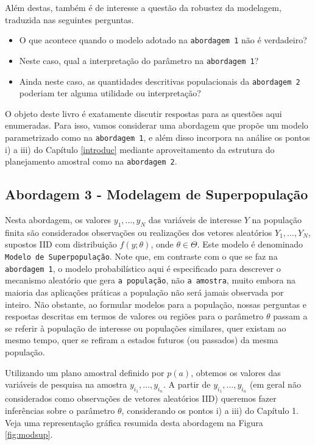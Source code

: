 \documentclass[]{book}
\providecommand{\tightlist}{%
  \setlength{\itemsep}{0pt}\setlength{\parskip}{0pt}}
\theoremstyle{definition}
\theoremstyle{definition}
\theoremstyle{definition}
\theoremstyle{remark}
\begin{document}
Além destas, também é de interesse a questão da robustez da modelagem,
traduzida nas seguintes perguntas.

\begin{itemize}
\tightlist
\item
  O que acontece quando o modelo adotado na \texttt{abordagem\ 1} não é
  verdadeiro?
\item
  Neste caso, qual a interpretação do parâmetro na
  \texttt{abordagem\ 1}?
\item
  Ainda neste caso, as quantidades descritivas populacionais da
  \texttt{abordagem\ 2} poderiam ter alguma utilidade ou interpretação?
\end{itemize}

O objeto deste livro é exatamente discutir respostas para as questões
aqui enumeradas. Para isso, vamos considerar uma abordagem que propõe um
modelo parametrizado como na \texttt{abordagem\ 1}, e além disso
incorpora na análise os pontos i) a iii) do Capítulo \ref{introduc}
mediante aproveitamento da estrutura do planejamento amostral como na
\texttt{abordagem\ 2}.

\subsection{Abordagem 3 - Modelagem de
Superpopulação}\label{modelsuperpop}

Nesta abordagem, os valores \(y_{1},\ldots ,y_{N}\) das variáveis de
interesse \(Y\) na população finita são considerados observações ou
realizações dos vetores aleatórios \(Y_{1},\ldots ,Y_{N}\), supostos IID
com distribuição \(f(y;\theta)\), onde \(\theta \in \Theta\). Este
modelo é denominado \texttt{Modelo\ de\ Superpopulação}. Note que, em
contraste com o que se faz na \texttt{abordagem\ 1}, o modelo
probabilístico aqui é especificado para descrever o mecanismo aleatório
que gera \texttt{a\ população}, não \texttt{a\ amostra}, muito embora na
maioria das aplicações práticas a população não será jamais observada
por inteiro. Não obstante, ao formular modelos para a população, nossas
perguntas e respostas descritas em termos de valores ou regiões para o
parâmetro \(\theta\) passam a se referir à população de interesse ou
populações similares, quer existam ao mesmo tempo, quer se refiram a
estados futuros (ou passados) da mesma população.

Utilizando um plano amostral definido por \(p(a)\), obtemos os valores
das variáveis de pesquisa na amostra \(y_{i_1},\ldots ,y_{i_n}\). A
partir de \(y_{i_1},\ldots ,y_{i_n}\) (em geral não considerados como
observações de vetores aleatórios IID) queremos fazer inferências sobre
o parâmetro \(\theta\), considerando os pontos i) a iii) do Capítulo 1.
Veja uma representação gráfica resumida desta abordagem na Figura
\ref{fig:modsup}.
\end{document}
